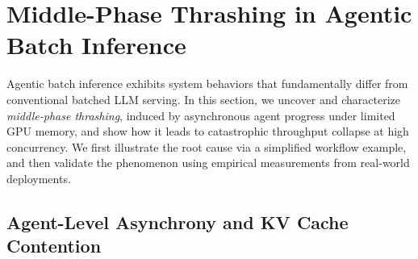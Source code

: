 \section{Middle-Phase Thrashing in Agentic Batch Inference}
\label{sec:motivation}



Agentic batch inference exhibits system behaviors that fundamentally differ from conventional batched LLM serving.
In this section, we uncover and characterize \textit{middle-phase thrashing}, induced by asynchronous agent progress under limited GPU memory, and show how it leads to catastrophic throughput collapse at high concurrency.
We first illustrate the root cause via a simplified workflow example, and then validate the phenomenon using empirical measurements from real-world deployments.

\subsection{Agent-Level Asynchrony and KV Cache Contention}

